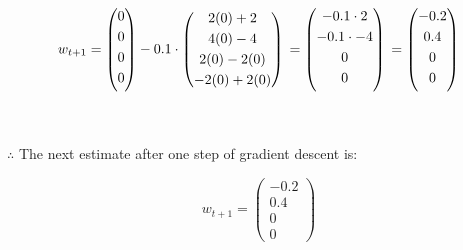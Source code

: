 \documentclass{article}
\begin{document}
$$
  w_{t+1} =  \begin{pmatrix}
    0 \vspace{0.1cm} \\
    0 \vspace{0.1cm} \\
    0 \vspace{0.1cm} \\
    0 \vspace{0.1cm} \\
  \end{pmatrix} - 0.1 \cdot
  \begin{pmatrix} 
    2(0) + 2 \vspace{0.1cm}\\
    4(0) - 4 \vspace{0.1cm}\\
    2(0) - 2(0) \vspace{0.1cm}\\
    -2(0) + 2(0)
  \end{pmatrix} \\
  = \begin{pmatrix}
    -0.1 \cdot 2 \vspace{0.1cm} \\
    -0.1 \cdot -4 \vspace{0.1cm} \\
    0 \vspace{0.1cm} \\
    0 \vspace{0.1cm} \\
  \end{pmatrix} \\
  = \begin{pmatrix}
    -0.2 \vspace{0.1cm} \\
    0.4 \vspace{0.1cm} \\
    0 \vspace{0.1cm} \\
    0 \vspace{0.1cm} \\
  \end{pmatrix} 
$$\\

\subsubsection*{\normalfont}{$\therefore$ The next estimate after one step of gradient descent is:}

$$w_{t+1} = \begin{pmatrix} 
-0.2 \\
0.4 \\
0 \\
0
\end{pmatrix}$$\\
\end{document}
